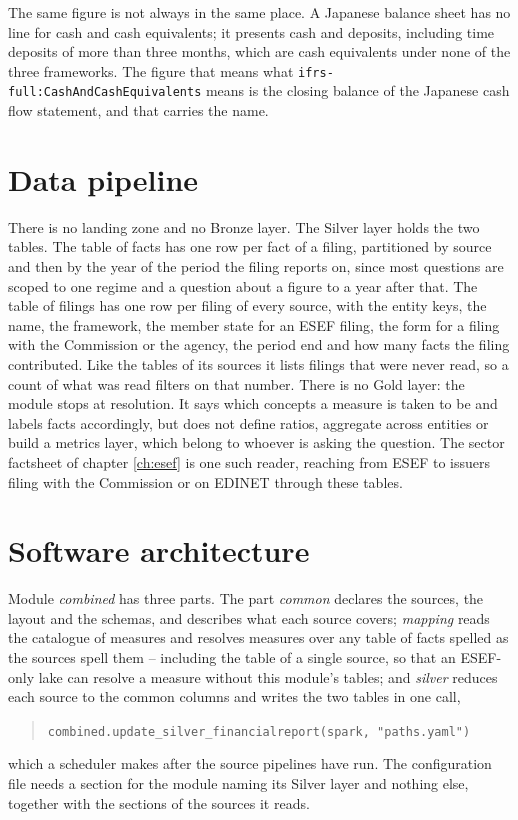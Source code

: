 The same figure is not always in the same place. A Japanese balance sheet has no line for cash and cash equivalents; it presents cash and deposits, including time deposits of more than three months, which are cash equivalents under none of the three frameworks. The figure that means what \verb|ifrs-full:CashAndCashEquivalents| means is the closing balance of the Japanese cash flow statement, and that carries the name.

\section{Data pipeline}

There is no landing zone and no Bronze layer. The Silver layer holds the two tables. The table of facts has one row per fact of a filing, partitioned by source and then by the year of the period the filing reports on, since most questions are scoped to one regime and a question about a figure to a year after that. The table of filings has one row per filing of every source, with the entity keys, the name, the framework, the member state for an ESEF filing, the form for a filing with the Commission or the agency, the period end and how many facts the filing contributed. Like the tables of its sources it lists filings that were never read, so a count of what was read filters on that number. There is no Gold layer: the module stops at resolution. It says which concepts a measure is taken to be and labels facts accordingly, but does not define ratios, aggregate across entities or build a metrics layer, which belong to whoever is asking the question. The sector factsheet of chapter \ref{ch:esef} is one such reader, reaching from ESEF to issuers filing with the Commission or on EDINET through these tables.

\section{Software architecture}

Module \emph{combined} has three parts. The part \emph{common} declares the sources, the layout and the schemas, and describes what each source covers; \emph{mapping} reads the catalogue of measures and resolves measures over any table of facts spelled as the sources spell them -- including the table of a single source, so that an ESEF-only lake can resolve a measure without this module's tables; and \emph{silver} reduces each source to the common columns and writes the two tables in one call,
\begin{quote}
\verb|combined.update_silver_financialreport(spark, "paths.yaml")|
\end{quote}
which a scheduler makes after the source pipelines have run. The configuration file needs a section for the module naming its Silver layer and nothing else, together with the sections of the sources it reads.

